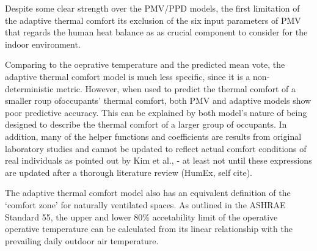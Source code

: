     Despite some clear strength over the PMV/PPD models, the first limitation of the adaptive thermal comfort its exclusion of the six input parameters of PMV that regards the human heat balance as as crucial component to consider for the indoor environment.

    Comparing to the oeprative temperature and the predicted mean vote, the adaptive thermal comfort model is much less specific, since it is a non-deterministic metric. However, when used to predict the thermal comfort of a smaller roup ofoccupants' thermal comfort, both PMV and adaptive models show poor predictive accuracy. This can be explained by both model's nature of being designed to describe the thermal comfort of a larger group of occupants\cite{van_hoof_forty_2008,auffenberg_personalised_2015}. In addition, many of the helper functions and coefficients are results from original laboratory studies and cannot be updated to reflect actual comfort conditions of real individuals as pointed out by Kim et al., \cite{kim_personal_2018} - at least not until these expressions are updated after a thorough literature review (HumEx, self cite).

    The adaptive thermal comfort model also has an equivalent definition of the `comfort zone' for naturally ventilated spaces\cite{ashrae_ansi/ashrae_2013}. As outlined in the ASHRAE Standard 55, the upper and lower 80\% accetability limit of the operative operative temperature can be calculated from its linear relationship with the prevailing daily outdoor air temperature. 
